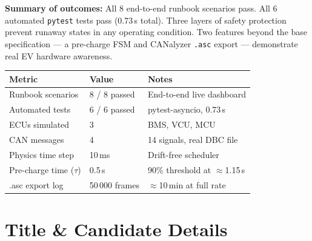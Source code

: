 \documentclass[12pt, a4paper, openany]{report}
\newcommand{\code}[1]{\texttt{#1}}
\begin{document}
\smallskip

\begin{resultbox}
\textbf{Summary of outcomes:} All 8 end-to-end runbook scenarios pass.
All 6 automated \code{pytest} tests pass (0.73\,s total). Three layers of
safety protection prevent runaway states in any operating condition.
Two features beyond the base specification --- a pre-charge FSM and
CANalyzer \code{.asc} export --- demonstrate real EV hardware awareness.
\end{resultbox}

\smallskip

\begin{center}
\begin{tabular}{llp{5.5cm}}
  \toprule
  \rowcolor{TblHead}
  \color{white}\textbf{Metric} &
  \color{white}\textbf{Value} &
  \color{white}\textbf{Notes} \\
  \midrule
  Runbook scenarios         & 8 / 8 passed   & End-to-end live dashboard \\
  \rowcolor{TblAlt}
  Automated tests           & 6 / 6 passed   & pytest-asyncio, 0.73\,s \\
  ECUs simulated            & 3              & BMS, VCU, MCU \\
  \rowcolor{TblAlt}
  CAN messages              & 4              & 14 signals, real DBC file \\
  Physics time step         & 10\,ms         & Drift-free scheduler \\
  \rowcolor{TblAlt}
  Pre-charge time ($\tau$)  & 0.5\,s         & 90\% threshold at $\approx$1.15\,s \\
  .asc export log           & 50\,000 frames & $\approx$10\,min at full rate \\
  \bottomrule
\end{tabular}
\end{center}

\clearpage

\tableofcontents
\clearpage

\chapter{Title \& Candidate Details}
\end{document}
